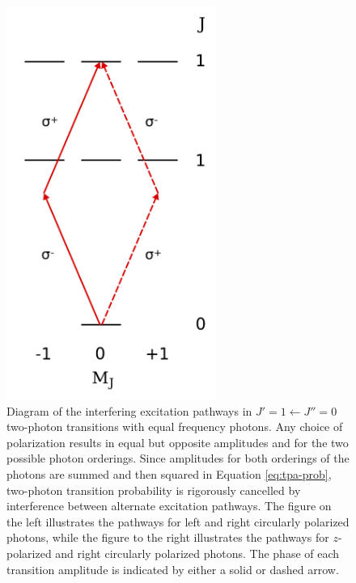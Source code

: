\begin{figure}
  \caption{Diagram of the interfering excitation pathways in $J'=1
    \leftarrow J''=0$ two-photon transitions with equal frequency
    photons.  Any choice of polarization results in equal but opposite
    amplitudes and for the two possible photon orderings. Since
    amplitudes for both orderings of the photons are summed and then
    squared in Equation \ref{eq:tpa-prob}, two-photon transition
    probability is rigorously cancelled by interference between
    alternate excitation pathways. The figure on the left illustrates
    the pathways for left and right circularly polarized photons,
    while the figure to the right illustrates the pathways for
    $z$-polarized and right circularly polarized photons.  The phase
    of each transition amplitude is indicated by either a solid or
    dashed arrow.}
  \label{fig:hg-forbidden}
  \centering
  \vspace{5mm}
  \includegraphics[width=2.7in]{hg-forbidden-samepol.pdf}

\end{figure}
